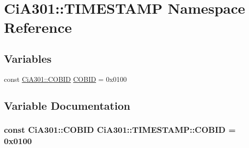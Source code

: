 \hypertarget{namespace_ci_a301_1_1_t_i_m_e_s_t_a_m_p}{}\section{Ci\+A301\+:\+:T\+I\+M\+E\+S\+T\+A\+M\+P Namespace Reference}
\label{namespace_ci_a301_1_1_t_i_m_e_s_t_a_m_p}
\subsection*{Variables}
\begin{DoxyCompactItemize}
\item 
const \hyperlink{namespace_ci_a301_aec5b5dbb2b60d2837c60499f6f297aa7}{Ci\+A301\+::\+C\+O\+B\+I\+D} \hyperlink{namespace_ci_a301_1_1_t_i_m_e_s_t_a_m_p_a67ab74f38c31e9ad9f34261294bcb62f}{C\+O\+B\+I\+D} = 0x0100
\end{DoxyCompactItemize}


\subsection{Variable Documentation}
\hypertarget{namespace_ci_a301_1_1_t_i_m_e_s_t_a_m_p_a67ab74f38c31e9ad9f34261294bcb62f}{}
\subsubsection[{C\+O\+B\+I\+D}]{\setlength{\rightskip}{0pt plus 5cm}const {\bf Ci\+A301\+::\+C\+O\+B\+I\+D} Ci\+A301\+::\+T\+I\+M\+E\+S\+T\+A\+M\+P\+::\+C\+O\+B\+I\+D = 0x0100}\label{namespace_ci_a301_1_1_t_i_m_e_s_t_a_m_p_a67ab74f38c31e9ad9f34261294bcb62f}
